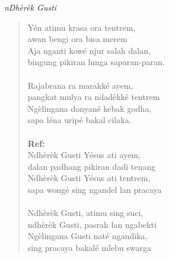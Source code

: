 \scriptsize
\begin{center}
	\itshape{nDh\`{e}r\`{e}k Gusti}
\end{center}
\begin{verse}
	\itshape{
Y\'{e}n atimu krasa ora tentrem, \\
awan bengi ora bisa merem\\
Aja nganti kow\'{e} njur salah dalan,\\
bingung pikiran lunga saparan-paran.\\
{~}\\
Rajabrana ra marakk\'{e} ayem,\\ 
pangkat mulya ra ndad\`{e}kk\'{e} tentrem\\
Ng\`{e}lingana donyan\'{e} kebak godha,\\ 
sapa l\'{e}na urip\'{e} bakal cilaka.\\
{~}\\
\textbf{Ref:}\\
Ndh\`{e}r\`{e}k Gusti Y\'{e}sus ati ayem, \\
dalan padhang pikiran dadi tenang\\
Ndh\`{e}r\`{e}k Gusti Y\'{e}sus ati tentrem, \\
sapa wong\'{e} sing ngandel lan pracaya\\
{~}\\
Ndh\`{e}r\`{e}k Gusti, atimu sing suci,\\
ndh\`{e}r\`{e}k Gusti, pasrah lan ngabekti\\
Ng\`{e}lingana Gusti nat\'{e} ngandika, \\
sing pracaya bakal\'{e} mlebu swarga
		
}
\end{verse}
\normalsize